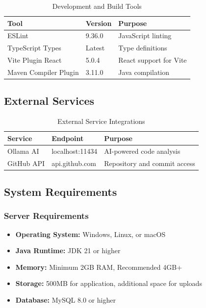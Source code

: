 \documentclass[12pt,a4paper]{article}
\begin{document}
    \begin{table}[H]
        \caption{Development and Build Tools}
        \begin{tabular}{|l|l|p{6cm}|}
            \hline
            \textbf{Tool} & \textbf{Version} & \textbf{Purpose} \\
            \hline
            ESLint & 9.36.0 & JavaScript linting \\
            \hline
            TypeScript Types & Latest & Type definitions \\
            \hline
            Vite Plugin React & 5.0.4 & React support for Vite \\
            \hline
            Maven Compiler Plugin & 3.11.0 & Java compilation \\
            \hline
        \end{tabular}
    \end{table}

    \subsection{External Services}

    \begin{table}[H]
        \caption{External Service Integrations}
        \begin{tabular}{|l|l|p{6cm}|}
            \hline
            \textbf{Service} & \textbf{Endpoint} & \textbf{Purpose} \\
            \hline
            Ollama AI & localhost:11434 & AI-powered code analysis \\
            \hline
            GitHub API & api.github.com & Repository and commit access \\
            \hline
        \end{tabular}
    \end{table}

    \subsection{System Requirements}

    \subsubsection{Server Requirements}

    \begin{itemize}[leftmargin=0.5in]
        \item \textbf{Operating System:} Windows, Linux, or macOS
        \item \textbf{Java Runtime:} JDK 21 or higher
        \item \textbf{Memory:} Minimum 2GB RAM, Recommended 4GB+
        \item \textbf{Storage:} 500MB for application, additional space for uploads
        \item \textbf{Database:} MySQL 8.0 or higher
    \end{itemize}
\end{document}

